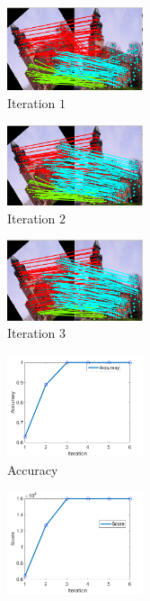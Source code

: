 \documentclass[hyperref={pdfpagelabels=false}]{beamer}
\begin{document}
\begin{frame}[allowframebreaks]
\begin{figure} 
	\begin{center}
		\begin{subfigure}[t]{0.32\textwidth}
			\includegraphics[width=4cm]{"fig/evaluation/ImageTrafo/sIterations/It1"} 
			\caption{\scriptsize Iteration $1$}
		\end{subfigure}
		\begin{subfigure}[t]{0.32\textwidth}
			\includegraphics[width=4cm]{"fig/evaluation/ImageTrafo/sIterations/It2"} 
			\caption{\scriptsize Iteration $2$}
		\end{subfigure} 
		\begin{subfigure}[t]{0.32\textwidth}
			\includegraphics[width=4cm]{"fig/evaluation/ImageTrafo/sIterations/It3"}
			\caption{\scriptsize Iteration $3$}
		\end{subfigure} 	
		\begin{subfigure}[t]{0.32\textwidth}
			\includegraphics[width=4cm]{"fig/evaluation/ImageTrafo/sIterations/accuracy"}
			\caption{\scriptsize Accuracy\hspace{5pt}}
		\end{subfigure} 
		\begin{subfigure}[t]{0.32\textwidth}
			\includegraphics[width=4cm]{"fig/evaluation/ImageTrafo/sIterations/score"}

\end{subfigure}
\end{center}
\end{figure}
\end{frame}
\end{document}
